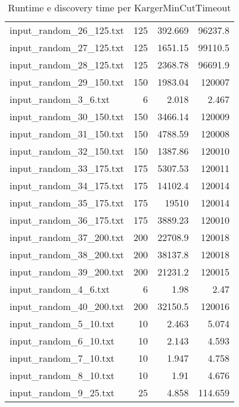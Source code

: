 \begin{table}[H]
\begin{tabular}{lrrr}
     input\_random\_26\_125.txt &     125 &          392.669 &      96237.8   \\
     input\_random\_27\_125.txt &     125 &         1651.15  &      99110.5   \\
     input\_random\_28\_125.txt &     125 &         2368.78  &      96691.9   \\
     input\_random\_29\_150.txt &     150 &         1983.04  &     120007     \\
     input\_random\_3\_6.txt    &       6 &            2.018 &          2.467 \\
     input\_random\_30\_150.txt &     150 &         3466.14  &     120009     \\
     input\_random\_31\_150.txt &     150 &         4788.59  &     120008     \\
     input\_random\_32\_150.txt &     150 &         1387.86  &     120010     \\
     input\_random\_33\_175.txt &     175 &         5307.53  &     120011     \\
     input\_random\_34\_175.txt &     175 &        14102.4   &     120014     \\
     input\_random\_35\_175.txt &     175 &        19510     &     120014     \\
     input\_random\_36\_175.txt &     175 &         3889.23  &     120010     \\
     input\_random\_37\_200.txt &     200 &        22708.9   &     120018     \\
     input\_random\_38\_200.txt &     200 &        38137.8   &     120018     \\
     input\_random\_39\_200.txt &     200 &        21231.2   &     120015     \\
     input\_random\_4\_6.txt    &       6 &            1.98  &          2.47  \\
     input\_random\_40\_200.txt &     200 &        32150.5   &     120016     \\
     input\_random\_5\_10.txt   &      10 &            2.463 &          5.074 \\
     input\_random\_6\_10.txt   &      10 &            2.143 &          4.593 \\
     input\_random\_7\_10.txt   &      10 &            1.947 &          4.758 \\
     input\_random\_8\_10.txt   &      10 &            1.91  &          4.676 \\
     input\_random\_9\_25.txt   &      25 &            4.858 &        114.659 \\
     \hline
    \end{tabular}

    \caption{Runtime e discovery time per KargerMinCutTimeout}
    \label{table:kargertimeout-running-time}
\end{table}
